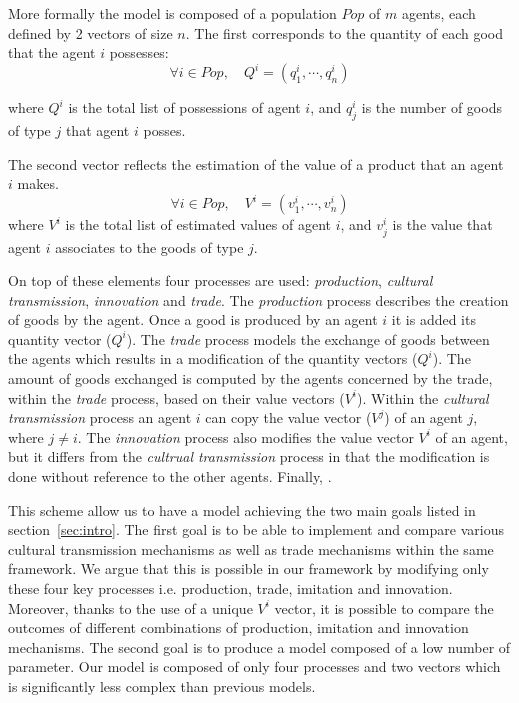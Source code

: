 \documentclass{wscpaperproc}
\begin{document}
More formally the model is composed of a population $Pop$ of $m$ agents, each defined by 2 vectors of size $n$. The first corresponds to the quantity of each good that the agent $i$ possesses: 
$$\forall i \in Pop, \quad Q^i = (q^i_1,\cdots,q^i_n) $$

where $Q^i$ is the total list of possessions of agent $i$, and $q^i_j$ is the number of goods of type $j$ that agent $i$ posses.

The second vector reflects the estimation of the value of a product that an agent $i$ makes.
$$\forall i \in Pop, \quad V^i = (v^i_1,\cdots,v^i_n) $$
where $V^i$ is the total list of estimated values of agent $i$, and $v^i_j$ is the value that agent $i$ associates to the goods of type $j$.

On top of these elements four processes are used: \emph{production}, \emph{cultural transmission}, \emph{innovation} and \emph{trade}. The \textit{production} process describes the creation of goods by the agent. Once a good is produced by an agent $i$ it is added its quantity vector ($Q^i$). The \emph{trade} process models the exchange of goods between the agents which results in a modification of the quantity vectors ($Q^i$). The amount of goods exchanged is computed by the agents concerned by the trade, within the \emph{trade} process, based on their value vectors ($V^i$). Within the \textit{cultural transmission} process an agent $i$ can copy the value vector ($V^j$) of an agent $j$, where $j \neq i$. The \textit{innovation} process also modifies the value vector $V^i$ of an agent, but it differs from the \emph{cultrual transmission} process in that the modification is done without reference to the other agents. Finally, .

This scheme allow us to have a model achieving the two main goals listed in section~\ref{sec:intro}. The first goal is to be able to implement and compare various cultural transmission mechanisms as well as trade mechanisms within the same framework. We argue that this is possible in our framework by modifying only these four key processes i.e. production, trade, imitation and innovation. Moreover, thanks to the use of a unique $V^i$ vector, it is possible to compare the outcomes of different combinations of production, imitation and innovation mechanisms. The second goal is to produce a model composed of a low number of parameter. Our model is composed of only four processes and two vectors which is significantly less complex than previous models.
\end{document}
